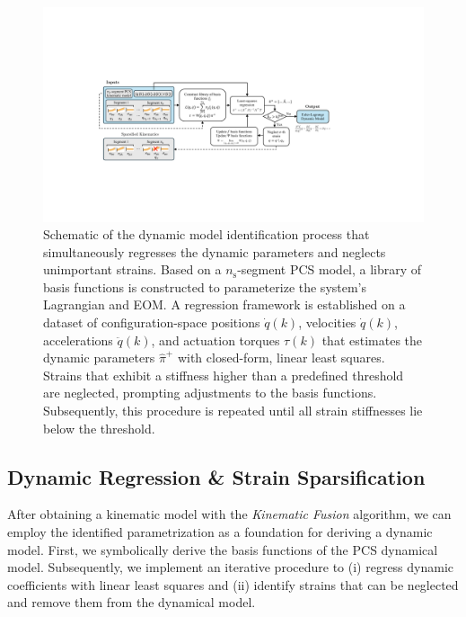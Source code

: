 \begin{figure}
    \centering
    \includegraphics[width=1.0\linewidth]{pcsregression/figures/diagram_dynamic_regression_v2_cropped.pdf}
    \caption{Schematic of the dynamic model identification process that simultaneously regresses the dynamic parameters and neglects unimportant strains. Based on a $n_\mathrm{s}$-segment PCS model, a library of basis functions is constructed to parameterize the system’s Lagrangian and \gls{EOM}. A regression framework is established on a dataset of configuration-space positions $\dot{q}(k)$, velocities $\dot{q}(k)$, accelerations $\ddot{q}(k)$, and actuation torques $\tau(k)$ that estimates the dynamic parameters $\hat{\pi}^+$ with closed-form, linear least squares. Strains that exhibit a stiffness higher than a predefined threshold are neglected, prompting adjustments to the basis functions. Subsequently, this procedure is repeated until all strain stiffnesses lie below the threshold.}
    \label{fig:pcsregression:dyn_regr}
\end{figure}

\subsection{Dynamic Regression \& Strain Sparsification}
After obtaining a kinematic model with the \emph{Kinematic Fusion} algorithm, we can employ the identified parametrization as a foundation for deriving a dynamic model. %
First, we symbolically derive the basis functions of the \gls{PCS} dynamical model.
Subsequently, we implement an iterative procedure to (i) regress dynamic coefficients with linear least squares and (ii) identify strains that can be neglected and remove them from the dynamical model.

